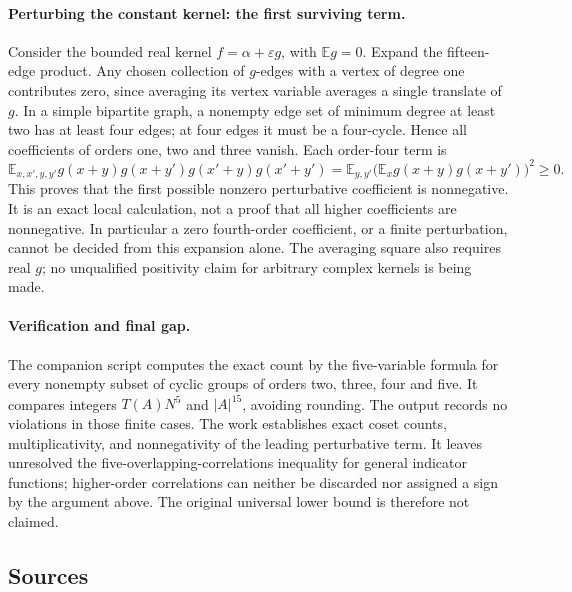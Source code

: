\documentclass[11pt,a4paper]{article}
\newcommand{\E}{\mathbb{E}}
\begin{document}
\paragraph{Perturbing the constant kernel: the first surviving term.}
Consider the bounded real kernel $f=\alpha+\varepsilon g$, with $\E g=0$. Expand the fifteen-edge product. Any chosen collection of $g$-edges with a vertex of degree one contributes zero, since averaging its vertex variable averages a single translate of $g$. In a simple bipartite graph, a nonempty edge set of minimum degree at least two has at least four edges; at four edges it must be a four-cycle. Hence all coefficients of orders one, two and three vanish. Each order-four term is
\[
 \E_{x,x',y,y'}g(x+y)g(x+y')g(x'+y)g(x'+y')
 =\E_{y,y'}\bigl(\E_x g(x+y)g(x+y')\bigr)^2\geq0.
\]
This proves that the first possible nonzero perturbative coefficient is nonnegative. It is an exact local calculation, not a proof that all higher coefficients are nonnegative. In particular a zero fourth-order coefficient, or a finite perturbation, cannot be decided from this expansion alone. The averaging square also requires real $g$; no unqualified positivity claim for arbitrary complex kernels is being made.

\paragraph{Verification and final gap.}
The companion script computes the exact count by the five-variable formula for every nonempty subset of cyclic groups of orders two, three, four and five. It compares integers $T(A)N^5$ and $|A|^{15}$, avoiding rounding. The output records no violations in those finite cases. The work establishes exact coset counts, multiplicativity, and nonnegativity of the leading perturbative term. It leaves unresolved the five-overlapping-correlations inequality for general indicator functions; higher-order correlations can neither be discarded nor assigned a sign by the argument above. The original universal lower bound is therefore not claimed.

\subsection{Sources}
\end{document}
